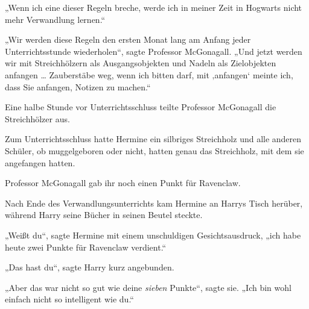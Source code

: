 „Wenn ich eine dieser Regeln breche, werde ich in meiner Zeit in Hogwarts nicht mehr Verwandlung lernen.“

„Wir werden diese Regeln den ersten Monat lang am Anfang jeder Unterrichtsstunde wiederholen“, sagte Professor McGonagall.
„Und jetzt werden wir mit Streichhölzern als Ausgangsobjekten und Nadeln als Zielobjekten anfangen … Zauberstäbe weg, wenn ich bitten darf, mit ‚anfangen‘ meinte ich, dass Sie anfangen, Notizen zu machen.“

Eine halbe Stunde vor Unterrichtsschluss teilte Professor McGonagall die Streichhölzer aus.

Zum Unterrichtsschluss hatte Hermine ein silbriges Streichholz und alle anderen Schüler, ob muggelgeboren oder nicht, hatten genau das Streichholz, mit dem sie angefangen hatten.

Professor McGonagall gab ihr noch einen Punkt für Ravenclaw.

\later

Nach Ende des Verwandlungsunterrichts kam Hermine an Harrys Tisch herüber, während Harry seine Bücher in seinen Beutel steckte.

„Weißt du“, sagte Hermine mit einem unschuldigen Gesichtsausdruck, „ich habe heute zwei Punkte für Ravenclaw verdient.“

„Das hast du“, sagte Harry kurz angebunden.

„Aber das war nicht so gut wie deine \emph{sieben} Punkte“, sagte sie.
„Ich bin wohl einfach nicht so intelligent wie du.“

